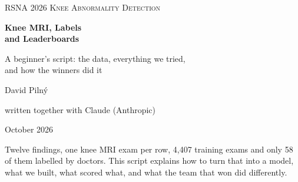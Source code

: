 \begin{titlepage}
\thispagestyle{empty}
\vspace*{8mm}
{\large\scshape RSNA 2026 Knee Abnormality Detection\par}
\vspace{6mm}
{\fontsize{30}{36}\selectfont\bfseries Knee MRI, Labels\\[2mm] and Leaderboards\par}
\vspace{6mm}
{\Large A beginner's script: the data, everything we tried,\\ and how the winners did it\par}
\vspace{12mm}
\begin{center}
\end{center}
\vfill
{\large David Pilný\par}
{\normalsize written together with Claude (Anthropic)\par}
\vspace{2mm}
{\normalsize October 2026\par}
\vspace{6mm}
{\small\textcolor{muted}{Twelve findings, one knee MRI exam per row, 4,407 training exams and only 58 of them labelled by doctors.
This script explains how to turn that into a model, what we built, what scored what, and what the team that won did differently.}\par}
\end{titlepage}
